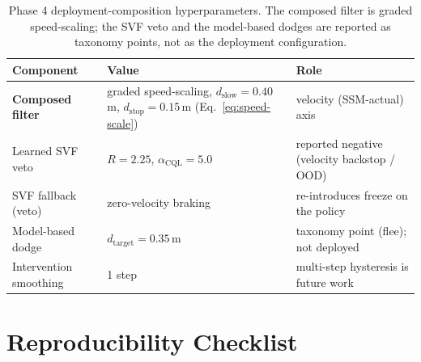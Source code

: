 \documentclass[11pt,a4paper]{report}
\newcommand{\ssm}{SSM}
\begin{document}
\begin{table}[h]
\centering
\small
\caption{Phase 4 deployment-composition hyperparameters. The
composed filter is graded speed-scaling; the SVF veto and the
model-based dodges are reported as taxonomy points, not as the
deployment configuration.}
\label{tab:app-hparams-hybrid}
\begin{tabular}{lll}
\toprule
Component & Value & Role \\
\midrule
\textbf{Composed filter} & graded speed-scaling, $d_{\mathrm{slow}} = 0.40$\,m, $d_{\mathrm{stop}} = 0.15$\,m (Eq.~\ref{eq:speed-scale}) & velocity (\ssm{}-actual) axis \\
Learned SVF veto & $R = 2.25$, $\alpha_{\mathrm{CQL}} = 5.0$ & reported negative (velocity backstop / OOD) \\
SVF fallback (veto) & zero-velocity braking & re-introduces freeze on the policy \\
Model-based dodge & $d_{\mathrm{target}} = 0.35$\,m & taxonomy point (flee); not deployed \\
Intervention smoothing & 1 step & multi-step hysteresis is future work \\
\bottomrule
\end{tabular}
\end{table}

\chapter{Reproducibility Checklist}
\label{app:repro}
\end{document}
